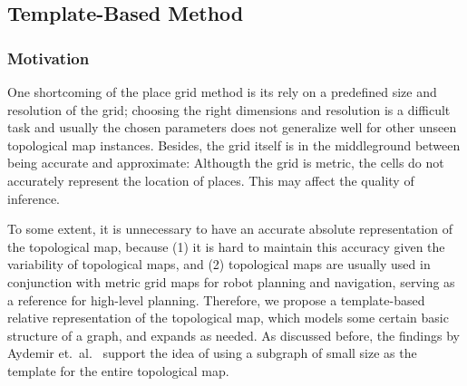 \documentclass[10pt, titlepage]{article}
\theoremstyle{definition}
\begin{document}


\subsection{Template-Based Method}\label{section:tmpl}

\subsubsection{Motivation}
One shortcoming of the place grid method is its rely on a predefined size and resolution of the grid; choosing the right dimensions and resolution is a difficult task and usually the chosen parameters does not generalize well for other unseen topological map instances. Besides, the grid itself is in the middleground between being accurate and approximate: Althougth the grid is metric, the cells do not accurately represent the location of places. This may affect the quality of inference.

To some extent, it is unnecessary to have an accurate absolute representation of the topological map, because (1) it is hard to maintain this accuracy given the variability of topological maps, and (2) topological maps are usually used in conjunction with metric grid maps for robot planning and navigation, serving as a reference for high-level planning. Therefore, we propose a template-based relative representation of the topological map, which models some certain basic structure of a graph, and expands as needed. As discussed before, the findings by  Aydemir et.~al.~\cite{aydemir2012can} support the idea of using a subgraph of small size as the template for the entire topological map.
\end{document}
